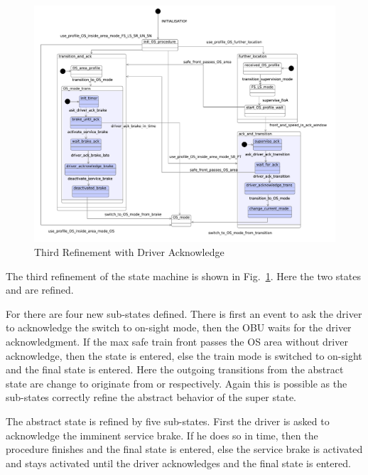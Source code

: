\documentclass{template/openetcs_article}
\begin{document}
\begin{figure}[ht]
  \centering
  \includegraphics[width=.95\textwidth]{m3_driver_ack_on_sight_procedure}
  \caption{Third Refinement with Driver Acknowledge}
  \label{fig:third-refinement-driver-ack}
\end{figure}

The third refinement of the state machine is shown in
Fig.~\ref{fig:third-refinement-driver-ack}. Here the two states
 and  are refined. 

For  there are four new sub-states defined. There is
first an event to ask the driver to acknowledge the switch to on-sight mode,
then the OBU waits for the driver acknowledgment. If the max safe train front
passes the OS area without driver acknowledge, then the
 state is entered, else the train mode is switched to
on-sight and the final state is entered. Here the outgoing transitions from the
abstract  state are change to originate from
 or  respectively. Again this
is possible as the sub-states correctly refine the abstract behavior of the
super state.

The abstract  state is refined by five sub-states. First
the driver is asked to acknowledge the imminent service brake. If he does so in
time, then the procedure finishes and the final state is entered, else the
service brake is activated and stays activated until the driver acknowledges and
the final state is entered.
\end{document}
